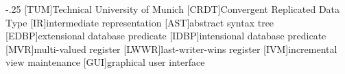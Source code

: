 \documentclass[headsepline,footsepline,footinclude=false,oneside,fontsize=11pt,paper=a4,listof=totoc,bibliography=totoc]{scrbook} %
\begin{document}


\frontmatter{}





\tableofcontents{}

\mainmatter{}







\appendix{}


\begin{acronym}
	\itemsep-.25\baselineskip
	[TUM]{Technical University of Munich}
	[CRDT]{Convergent Replicated Data Type}
	[IR]{intermediate representation}
	[AST]{abstract syntax tree}
	[EDBP]{extensional database predicate}
	[IDBP]{intensional database predicate}
	[MVR]{multi-valued register}
	[LWWR]{last-writer-wins register}
	[IVM]{incremental view maintenance}
	[GUI]{graphical user interface}
\end{acronym}

\listoffigures{}
\listoftables{}
\printbibliography{}
\end{document}
